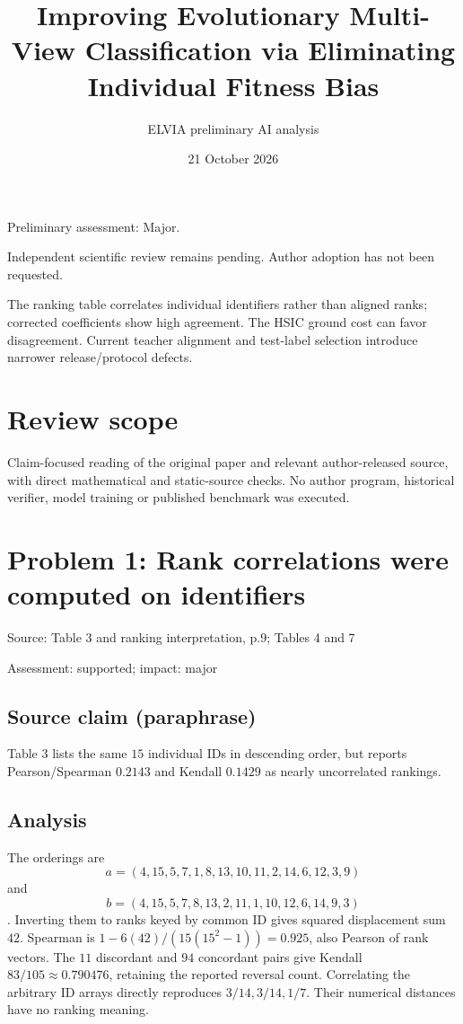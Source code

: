 \documentclass[11pt]{article}
\begin{document}
\title{Improving Evolutionary Multi-View Classification via Eliminating Individual Fitness Bias}

\author{ELVIA preliminary AI analysis}\date{21 October 2026}\maketitle

Preliminary assessment: Major.\par

Independent scientific review remains pending. Author adoption has not been requested.

The ranking table correlates individual identifiers rather than aligned ranks; corrected coefficients show high agreement. The HSIC ground cost can favor disagreement. Current teacher alignment and test-label selection introduce narrower release/protocol defects.

\section*{Review scope}

Claim-focused reading of the original paper and relevant author-released source, with direct mathematical and static-source checks. No author program, historical verifier, model training or published benchmark was executed.

\section*{Problem 1: Rank correlations were computed on identifiers}

Source: Table 3 and ranking interpretation, p.9; Tables 4 and 7

Assessment: supported; impact: major

\subsection*{Source claim (paraphrase)}

Table 3 lists the same \(15\) individual IDs in descending order, but reports Pearson/Spearman \(0.2143\) and Kendall \(0.1429\) as nearly uncorrelated rankings.

\subsection*{Analysis}

The orderings are \[a=(4,15,5,7,1,8,13,10,11,2,14,6,12,3,9)\] and \[b=(4,15,5,7,8,13,2,11,1,10,12,6,14,9,3)\]. Inverting them to ranks keyed by common ID gives squared displacement sum \(42\). Spearman is \(1-6(42)/(15(15^2-1))=0.925\), also Pearson of rank vectors. The \(11\) discordant and \(94\) concordant pairs give Kendall \(83/105\approx0.790476\), retaining the reported reversal count. Correlating the arbitrary ID arrays directly reproduces \(3/14,3/14,1/7\). Their numerical distances have no ranking meaning.
\end{document}
